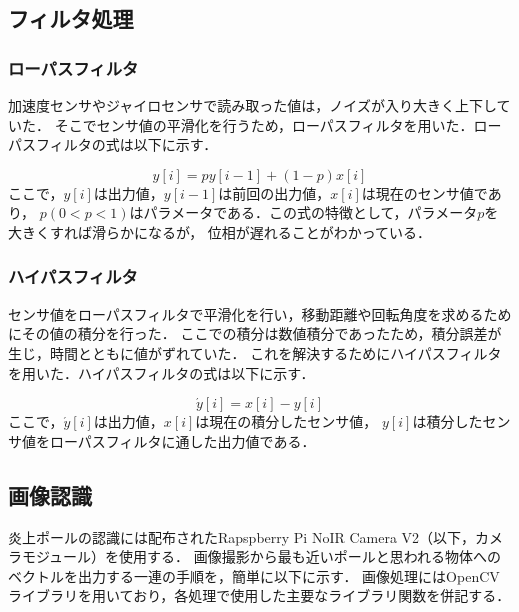 \documentclass[11pt,a4]{jsarticle}
\begin{document}
\subsection{フィルタ処理}
 \subsubsection{ローパスフィルタ}
 加速度センサやジャイロセンサで読み取った値は，ノイズが入り大きく上下していた．
そこでセンサ値の平滑化を行うため，ローパスフィルタを用いた．ローパスフィルタの式は以下に示す．

\begin{equation}
 y[i]=py[i-1]+(1-p)x[i]
 \label{low_pass}
\end{equation}
ここで，$y[i]$は出力値，$y[i-1]$は前回の出力値，$x[i]$は現在のセンサ値であり，
$p(0<p<1)$はパラメータである．この式の特徴として，パラメータ$p$を大きくすれば滑らかになるが，
位相が遅れることがわかっている．

   \subsubsection{ハイパスフィルタ}
センサ値をローパスフィルタで平滑化を行い，移動距離や回転角度を求めるためにその値の積分を行った．
ここでの積分は数値積分であったため，積分誤差が生じ，時間とともに値がずれていた．
これを解決するためにハイパスフィルタを用いた．ハイパスフィルタの式は以下に示す．

\begin{equation}
 \acute{y}[i]=x[i]-y[i]
 \label{high_pass}
\end{equation}
ここで，$\acute{y}[i]$は出力値，$x[i]$は現在の積分したセンサ値，
$y[i]$は積分したセンサ値をローパスフィルタに通した出力値である．



\subsection{画像認識}
  炎上ポールの認識には配布されたRapspberry Pi NoIR Camera V2（以下，カメラモジュール）を使用する．
  画像撮影から最も近いポールと思われる物体へのベクトルを出力する一連の手順を，簡単に以下に示す．
  画像処理にはOpenCVライブラリを用いており，各処理で使用した主要なライブラリ関数を併記する．
\end{document}
